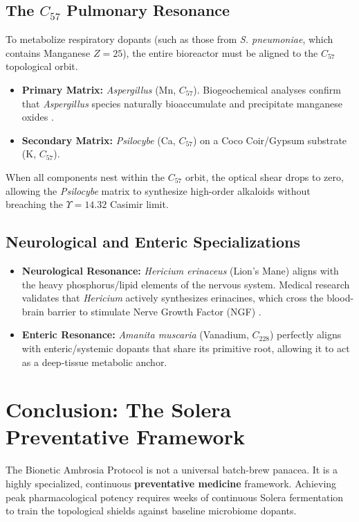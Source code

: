 \subsection{The $C_{57}$ Pulmonary Resonance}
To metabolize respiratory dopants (such as those from \textit{S. pneumoniae}, which contains Manganese $Z=25$), the entire bioreactor must be aligned to the $C_{57}$ topological orbit.
\begin{itemize}
    \item \textbf{Primary Matrix:} \textit{Aspergillus} (Mn, $C_{57}$). Biogeochemical analyses confirm that \textit{Aspergillus} species naturally bioaccumulate and precipitate manganese oxides \cite{AspergillusMn2022}.
    \item \textbf{Secondary Matrix:} \textit{Psilocybe} (Ca, $C_{57}$) on a Coco Coir/Gypsum substrate (K, $C_{57}$).
\end{itemize}
When all components nest within the $C_{57}$ orbit, the optical shear drops to zero, allowing the \textit{Psilocybe} matrix to synthesize high-order alkaloids without breaching the $\Upsilon = 14.32$ Casimir limit.

\subsection{Neurological and Enteric Specializations}
\begin{itemize}
    \item \textbf{Neurological Resonance:} \textit{Hericium erinaceus} (Lion's Mane) aligns with the heavy phosphorus/lipid elements of the nervous system. Medical research validates that \textit{Hericium} actively synthesizes erinacines, which cross the blood-brain barrier to stimulate Nerve Growth Factor (NGF) \cite{LionManeNGF2023}.
    \item \textbf{Enteric Resonance:} \textit{Amanita muscaria} (Vanadium, $C_{228}$) perfectly aligns with enteric/systemic dopants that share its primitive root, allowing it to act as a deep-tissue metabolic anchor.
\end{itemize}

\section{Conclusion: The Solera Preventative Framework}
The Bionetic Ambrosia Protocol is not a universal batch-brew panacea. It is a highly specialized, continuous \textbf{preventative medicine} framework. Achieving peak pharmacological potency requires weeks of continuous Solera fermentation to train the topological shields against baseline microbiome dopants. 

